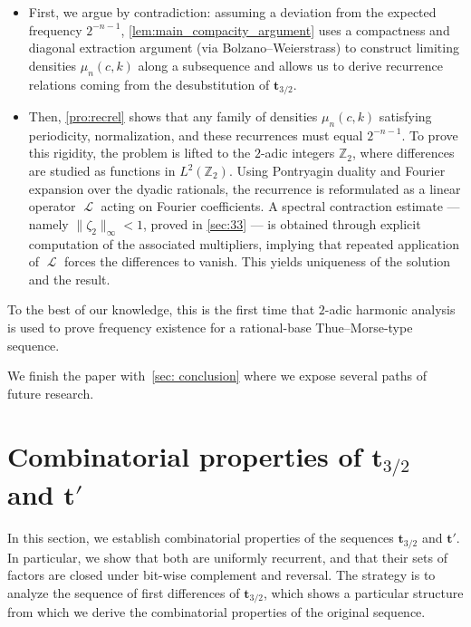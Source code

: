 \documentclass[12pt,reqno]{article}
\DeclareMathOperator{\Lop}{\mathcal{L}}
\begin{document}
\begin{itemize}
\item First,  we argue by contradiction: assuming a deviation from the expected frequency $2^{-n-1}$, \cref{lem:main_compacity_argument} uses a compactness and diagonal extraction argument (via Bolzano--Weierstrass) to construct limiting densities $\mu_n(c,k)$ along a subsequence and allows us to derive recurrence relations coming from the desubstitution of $\mathbf{t}_{3/2}$.
\item Then,  \cref{pro:recrel}  shows that any family of densities $\mu_n(c,k)$ satisfying periodicity, normalization, and these recurrences must equal $2^{-n-1}$. To prove this rigidity, the problem is lifted to the $2$-adic integers $\mathbb{Z}_2$, where differences  are studied as functions in $L^2(\mathbb{Z}_2)$. Using Pontryagin duality and Fourier expansion over the dyadic rationals, the recurrence is reformulated as a linear operator $\Lop$ acting on Fourier coefficients. A spectral contraction estimate --- namely $\|\zeta_2\|_\infty<1$, proved in \cref{sec:33} --- is obtained through explicit computation of the associated multipliers, implying that repeated application of 
$\Lop$ forces the differences to vanish. This yields uniqueness of the solution and the result.
\end{itemize}

To the best of our knowledge,  this is the first time that $2$-adic harmonic analysis is used to prove frequency existence for a rational-base Thue--Morse-type sequence.

\medskip

We finish the paper with~\cref{sec: conclusion} where we expose several paths of future research.


\section{Combinatorial properties of $\mathbf{t}_{3/2}$ and $\mathbf{t}'$}\label{sec:fd}

In this section,  we establish combinatorial properties of the sequences $\mathbf{t}_{3/2}$ and $\mathbf{t}'$.
In particular,  we show that both are uniformly recurrent,  and that their sets of factors are closed under bit-wise complement and reversal.
The strategy is to analyze the sequence of first differences of $\mathbf{t}_{3/2}$,  which shows a particular structure from which we derive the combinatorial properties of the original sequence.
\end{document}
